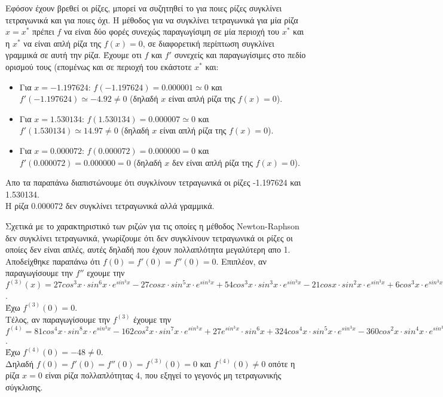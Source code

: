 \documentclass[a4paper,11pt]{article}
\newcommand{\lt}{\latintext}
\begin{document}
Εφόσον έχουν βρεθεί οι ρίζες, μπορεί να συζητηθεί το για ποιες ρίζες συγκλίνει τετραγωνικά και για ποιες όχι.
Η μέθοδος για να συγκλίνει τετραγωνικά για μία ρίζα $x = x^*$ πρέπει $f$ να είναι δύο φορές συνεχώς παραγωγίσιμη σε μία περιοχή του {\lt $x^*$} και η {\lt $x^*$} να είναι απλή ρίζα της $f(x) = 0$, σε διαφορετική περίπτωση συγκλίνει γραμμικά σε αυτή την ρίζα.
Έχουμε οτι $f$ και $f'$ συνεχείς και παραγωγίσιμες στο πεδίο ορισμού τους (επομένως και σε περιοχή του εκάστοτε {\lt $x^*$} και:
\begin{itemize}
    \item Για $x = -1.197624$: $f(-1.197624) = 0.000001 \simeq 0$ και $f'(-1.197624) \simeq -4.92 \neq 0$ (δηλαδή {\lt $x$} είναι απλή ρίζα της $f(x) = 0$).
    \item Για $x = 1.530134$: $f(1.530134) = 0.000007 \simeq 0$ και $f'(1.530134) \simeq 14.97 \neq 0$ (δηλαδή {\lt $x$} είναι απλή ρίζα της $f(x) = 0$).
    \item Για $x = 0.000072$: $f(0.000072) = 0.000000 = 0$ και $f'(0.000072) = 0.000000 = 0$ (δηλαδή {\lt $x$} δεν είναι απλή ρίζα της $f(x) = 0$).
\end{itemize}

Απο τα παραπάνω διαπιστώνουμε ότι συγκλίνουν τετραγωνικά οι ρίζες -1.197624 και 1.530134.\\
Η ρίζα 0.000072 δεν συγκλίνει τετραγωνικά αλλά γραμμικά.

\par
Σχετικά με το χαρακτηριστικό των ριζών για τις οποίες η μέθοδος {\lt Newton-Raphson} δεν συγκλίνει τετραγωνικά, γνωρίζουμε ότι δεν συγκλίνουν τετραγωνικά οι ρίζες οι οποίες δεν είναι απλές, αυτές δηλαδή που έχουν πολλαπλότητα μεγαλύτερη απο 1.\\
Αποδείχθηκε παραπάνω ότι $f(0) = f'(0) = f''(0) = 0$.
Επιπλέον, αν παραγωγίσουμε την $f''$ εχουμε την $f^{(3)}(x) = 27cos^3x \cdot sin^6x \cdot e^{sin^3x} - 27cosx \cdot sin^5x \cdot e^{sin^3x} + 54cos^3x \cdot sin^3x \cdot e^{sin^3x} - 21cosx \cdot sin^2x \cdot e^{sin^3x} + 6cos^3x \cdot e^{sin^3x} + 120x^3 -48x -6$.\\
Έχω $f^{(3)}(0) = 0$.\\

Τέλος, αν παραγωγίσουμε την $f^{(3)}$ έχουμε την $f^{(4)} = 81cos^4x \cdot sin^8x \cdot e^{sin^3x} - 162cos^2x \cdot sin^7x \cdot e^{sin^3x} + 27e^{sin^3x} \cdot sin^6x + 324cos^4x \cdot sin^5x \cdot e^{sin^3x} -360cos^2x \cdot sin^4x \cdot e^{sin^3x} + 21e^{sin^3x} \cdot sin^3x + 180sin^2x \cdot cos^4x \cdot e^{sin^3x} - 60sinx \cdot cos^2x \cdot e^{sin^3x} + 360x^2 - 48$.\\
Έχω $f^{(4)}(0) = -48 \neq 0$.\\
Δηλαδή $f(0) = f'(0) = f''(0) = f^{(3)}(0) = 0$ και $f^{(4)}(0) \neq 0$ οπότε η ρίζα $x = 0$ είναι ρίζα πολλαπλότητας 4, που εξηγεί το γεγονός μη τετραγωνικής σύγκλισης.
\end{document}
